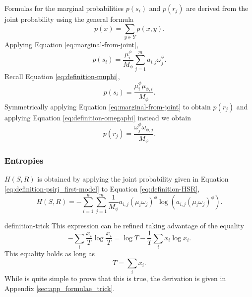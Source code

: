Formulas for the marginal probabilities $p(s_i)$ and $p(r_j)$ are derived from the joint probability using the general formula
\begin{equation}
  \label{eq:marginal-from-joint}
  p(x) = \sum_{y \in Y} p(x,y).
\end{equation}
Applying Equation \eqref{eq:marginal-from-joint},
\begin{equation*}
  p(s_i) = \frac{\mu_i^\phi}{M_\phi} \sum_{j=1}^m a_{i,j} \omega_j^\phi.
\end{equation*}
Recall Equation \eqref{eq:definition-muphi},
\begin{equation}
  \label{eq:definition-psi_first-model}
  p(s_i) = \frac{\mu_i^\phi \mu_{\phi,i}}{M_\phi}.
\end{equation}
Symmetrically applying Equation \eqref{eq:marginal-from-joint} to obtain $p(r_j)$ and applying Equation \eqref{eq:definition-omegaphi} instead we obtain
\begin{equation}
  \label{eq:definition-prj_first-model}
  p(r_j) = \frac{\omega_j^\phi \omega_{\phi,j}}{M_\phi}.
\end{equation}

\subsubsection{Entropies}

$H(S,R)$ is obtained by applying the joint probability given in Equation \eqref{eq:definition-psirj_first-model} to Equation \eqref{eq:definition-HSR},
\begin{equation}
  \label{eq:step-HSR}
  H(S,R) = -\sum_{i=1}^n \sum_{j=1}^m \frac{1}{M_\phi} a_{i,j} (\mu_i \omega_j)^\phi \log \left( a_{i,j} (\mu_i \omega_j)^\phi \right).
\end{equation}

\begin{property}{}{definition-trick}
  This expression can be refined taking advantage of the equality
  \begin{equation*}
    -\sum_i \frac{x_i}{T} \log\frac{x_i}{T} = \log T - \frac{1}{T} \sum_i x_i \log x_i.
  \end{equation*}
  This equality holds as long as
  \begin{equation*}
    T = \sum_i x_i.
  \end{equation*}
  While is quite simple to prove that this is true, the derivation is given in
  Appendix \ref{sec:app_formulae_trick}.

\end{property}

